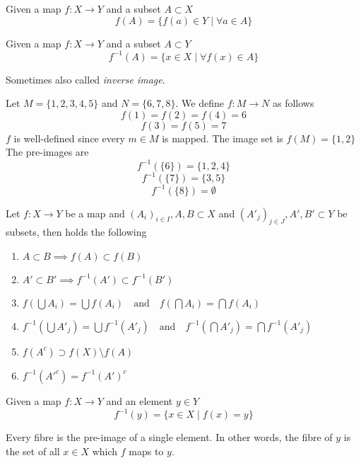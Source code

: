 \begin{definition}
   Given a map \(f: X \to Y\) and a subset \(A \subset X\)
   \[f(A) = \{f(a) \in Y \mid \forall a \in A\}\]
\end{definition}

\begin{definition}\label{def:pre-image}
   Given a map \(f: X \to Y\) and a subset \(A \subset Y\)
   \[f^{-1}(A) = \{x \in X \mid \forall f(x) \in A\}\]
\end{definition}
\begin{remark}
   Sometimes also called \textit{inverse image}.
\end{remark}

\begin{example}
   Let \(M = \{1, 2, 3, 4, 5\}\) and \(N = \{6, 7, 8\}\).
   We define \(f: M \to N\) as follows
   \[f(1) = f(2) = f(4) = 6\]
   \[f(3) = f(5) = 7\]
   \(f\) is well-defined since every \(m \in M\) is mapped.
   The image set is \(f(M) = \{1, 2\}\)
   The pre-images are
   \[f^{-1}(\{6\}) = \{1, 2, 4\}\]
   \[f^{-1}(\{7\}) = \{3, 5\}\]
   \[f^{-1}(\{8\}) = \emptyset\]
\end{example}

\begin{proposition}
   Let \(f: X \to Y\) be a map and \((A_i)_{i \in I}, A, B \subset X\) and \((A'_j)_{j \in J}, A', B' \subset Y\) be subsets, then holds the following
   \begin{enumerate}[label=\roman*, align=Center]
      \item \(A \subset B \implies f(A) \subset f(B)\)
      \item \(A' \subset B' \implies f^{-1}(A') \subset f^{-1}(B')\)
      \item \(f(\bigcup A_i) = \bigcup f(A_i) \quad\text{and}\quad f(\bigcap A_i) = \bigcap f(A_i)\)
      \item \(f^{-1}(\bigcup A'_j) = \bigcup f^{-1}(A'_j) \quad\text{and}\quad f^{-1}(\bigcap A'_j) = \bigcap f^{-1}(A'_j)\)
      \item \(f(A^c) \supset f(X) \setminus f(A)\)
      \item \(f^{-1}(A'^c) = f^{-1}(A')^c\)
   \end{enumerate}
\end{proposition}

\begin{definition}
   Given a map \(f: X \to Y\) and an element \(y \in Y\)
   \[f^{-1}(y) = \{x \in X \mid f(x) = y\}\]
\end{definition}
\begin{remark}
   Every fibre is the pre-image of a single element.
   In other words, the fibre of \(y\) is the set of all \(x \in X\) which \(f\) maps to \(y\).
\end{remark}


